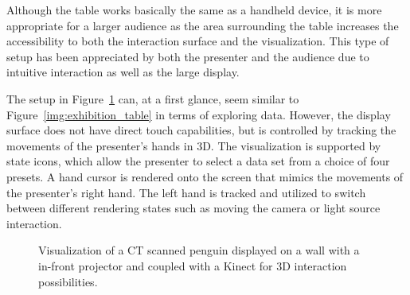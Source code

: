 \documentclass[journal]{vgtc}                %
\begin{document}
Although the table works basically the same as a handheld device, it is more appropriate for a larger audience as the area surrounding the table increases the accessibility to both the interaction surface and the visualization.
This type of setup has been appreciated by both the presenter and the audience due to intuitive interaction as well as the large display.


The setup in Figure~\ref{img:exhibition_kinect} can, at a first glance, seem similar to Figure~\ref{img:exhibition_table} in terms of exploring data.
However, the display surface does not have direct touch capabilities, but is controlled by tracking the movements of the presenter's hands in 3D.
The visualization is supported by state icons, which allow the presenter to select a data set from a choice of four presets.
A hand cursor is rendered onto the screen that mimics the movements of the presenter's right hand.
The left hand is tracked and utilized to switch between different rendering states such as moving the camera or light source interaction.

\begin{figure}[tb]
	\centering
	\caption{Visualization of a CT scanned penguin displayed on a wall with a in-front projector and coupled with a Kinect for 3D interaction possibilities.}
	\label{img:exhibition_kinect}
\end{figure}
\end{document}
